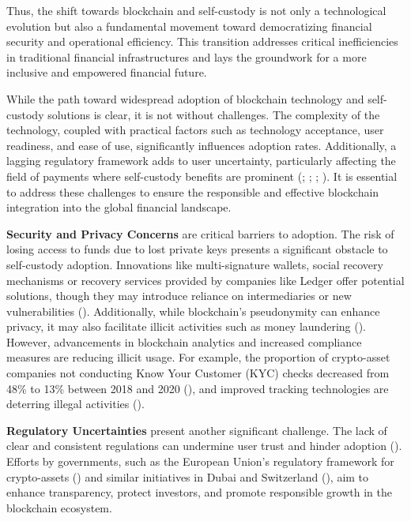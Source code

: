 \documentclass[twocolumn]{article}
\begin{document}
Thus, the shift towards blockchain and self-custody is not only a technological evolution but also a fundamental movement toward democratizing financial security and operational efficiency. This transition addresses critical inefficiencies in traditional financial infrastructures and lays the groundwork for a more inclusive and empowered financial future.

While the path toward widespread adoption of blockchain technology and self-custody solutions is clear, it is not without challenges. The complexity of the technology, coupled with practical factors such as technology acceptance, user readiness, and ease of use, significantly influences adoption rates. Additionally, a lagging regulatory framework adds to user uncertainty, particularly affecting the field of payments where self-custody benefits are prominent (\cite{bockel_blockchain_2021}; \cite{dehghani_high_2022}; \cite{rugeviciute_blockchain_2019}; \cite{sagheer_factors_2022}). It is essential to address these challenges to ensure the responsible and effective blockchain integration into the global financial landscape.

\textbf{Security and Privacy Concerns} are critical barriers to adoption. The risk of losing access to funds due to lost private keys presents a significant obstacle to self-custody adoption. Innovations like multi-signature wallets, social recovery mechanisms or recovery services provided by companies like Ledger offer potential solutions, though they may introduce reliance on intermediaries or new vulnerabilities (\cite{buterin_why_2021, ledger_restore_nodate, scrypt_social_2023, kubach_self-sovereign_2020}). Additionally, while blockchain's pseudonymity can enhance privacy, it may also facilitate illicit activities such as money laundering (\cite{foley_sex_2018}). However, advancements in blockchain analytics and increased compliance measures are reducing illicit usage. For example, the proportion of crypto-asset companies not conducting Know Your Customer (KYC) checks decreased from 48\% to 13\% between 2018 and 2020 (\cite{blandin_3rd_2020}), and improved tracking technologies are deterring illegal activities (\cite{al-mughrabi_hamas_2023}).

\textbf{Regulatory Uncertainties} present another significant challenge. The lack of clear and consistent regulations can undermine user trust and hinder adoption (\cite{hashemi_joo_cryptocurrency_2020}). Efforts by governments, such as the European Union's regulatory framework for crypto-assets (\cite{council_of_the_eu_digital_2023}) and similar initiatives in Dubai and Switzerland (\cite{huertas_pwc_2022}), aim to enhance transparency, protect investors, and promote responsible growth in the blockchain ecosystem.
\end{document}
